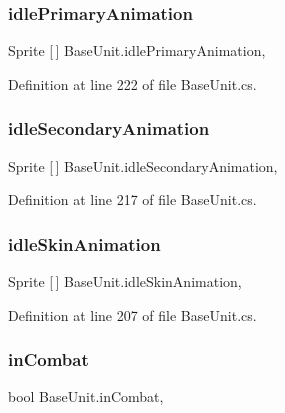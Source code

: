 \subsubsection{\texorpdfstring{idlePrimaryAnimation}{idlePrimaryAnimation}}
{\footnotesize\ttfamily Sprite \mbox{[}$\,$\mbox{]} Base\+Unit.\+idle\+Primary\+Animation\hspace{0.3cm}{\ttfamily [get]}, {\ttfamily [set]}}



Definition at line 222 of file Base\+Unit.\+cs.

\mbox{\label{class_base_unit_a5f2fe899c267b8fce178fbb0869df8dd}} 
\subsubsection{\texorpdfstring{idleSecondaryAnimation}{idleSecondaryAnimation}}
{\footnotesize\ttfamily Sprite \mbox{[}$\,$\mbox{]} Base\+Unit.\+idle\+Secondary\+Animation\hspace{0.3cm}{\ttfamily [get]}, {\ttfamily [set]}}



Definition at line 217 of file Base\+Unit.\+cs.

\mbox{\label{class_base_unit_a41adc9e3a4043cc54bc2f9f269958dbe}} 
\subsubsection{\texorpdfstring{idleSkinAnimation}{idleSkinAnimation}}
{\footnotesize\ttfamily Sprite \mbox{[}$\,$\mbox{]} Base\+Unit.\+idle\+Skin\+Animation\hspace{0.3cm}{\ttfamily [get]}, {\ttfamily [set]}}



Definition at line 207 of file Base\+Unit.\+cs.

\mbox{\label{class_base_unit_a37097f8d44bd8874d76b34d9d62eee9e}} 
\subsubsection{\texorpdfstring{inCombat}{inCombat}}
{\footnotesize\ttfamily bool Base\+Unit.\+in\+Combat\hspace{0.3cm}{\ttfamily [get]}, {\ttfamily [set]}}



